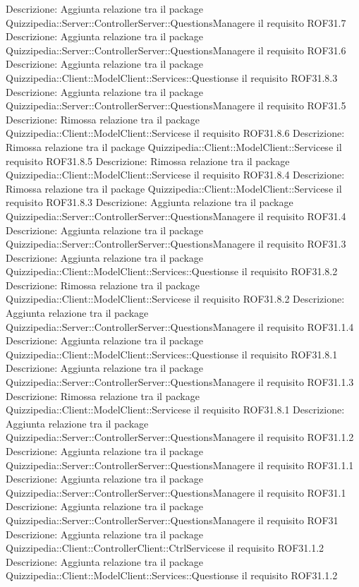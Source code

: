Descrizione: Aggiunta relazione tra il package Quizzipedia::Server::ControllerServer::QuestionsManagere il requisito ROF31.7 
Descrizione: Aggiunta relazione tra il package Quizzipedia::Server::ControllerServer::QuestionsManagere il requisito ROF31.6 
Descrizione: Aggiunta relazione tra il package Quizzipedia::Client::ModelClient::Services::Questionse il requisito ROF31.8.3 
Descrizione: Aggiunta relazione tra il package Quizzipedia::Server::ControllerServer::QuestionsManagere il requisito ROF31.5 
Descrizione: Rimossa relazione tra il package Quizzipedia::Client::ModelClient::Servicese il requisito ROF31.8.6 
Descrizione: Rimossa relazione tra il package Quizzipedia::Client::ModelClient::Servicese il requisito ROF31.8.5 
Descrizione: Rimossa relazione tra il package Quizzipedia::Client::ModelClient::Servicese il requisito ROF31.8.4 
Descrizione: Rimossa relazione tra il package Quizzipedia::Client::ModelClient::Servicese il requisito ROF31.8.3 
Descrizione: Aggiunta relazione tra il package Quizzipedia::Server::ControllerServer::QuestionsManagere il requisito ROF31.4 
Descrizione: Aggiunta relazione tra il package Quizzipedia::Server::ControllerServer::QuestionsManagere il requisito ROF31.3 
Descrizione: Aggiunta relazione tra il package Quizzipedia::Client::ModelClient::Services::Questionse il requisito ROF31.8.2 
Descrizione: Rimossa relazione tra il package Quizzipedia::Client::ModelClient::Servicese il requisito ROF31.8.2 
Descrizione: Aggiunta relazione tra il package Quizzipedia::Server::ControllerServer::QuestionsManagere il requisito ROF31.1.4 
Descrizione: Aggiunta relazione tra il package Quizzipedia::Client::ModelClient::Services::Questionse il requisito ROF31.8.1 
Descrizione: Aggiunta relazione tra il package Quizzipedia::Server::ControllerServer::QuestionsManagere il requisito ROF31.1.3 
Descrizione: Rimossa relazione tra il package Quizzipedia::Client::ModelClient::Servicese il requisito ROF31.8.1 
Descrizione: Aggiunta relazione tra il package Quizzipedia::Server::ControllerServer::QuestionsManagere il requisito ROF31.1.2 
Descrizione: Aggiunta relazione tra il package Quizzipedia::Server::ControllerServer::QuestionsManagere il requisito ROF31.1.1 
Descrizione: Aggiunta relazione tra il package Quizzipedia::Server::ControllerServer::QuestionsManagere il requisito ROF31.1 
Descrizione: Aggiunta relazione tra il package Quizzipedia::Server::ControllerServer::QuestionsManagere il requisito ROF31 
Descrizione: Aggiunta relazione tra il package Quizzipedia::Client::ControllerClient::CtrlServicese il requisito ROF31.1.2 
Descrizione: Aggiunta relazione tra il package Quizzipedia::Client::ModelClient::Services::Questionse il requisito ROF31.1.2 
